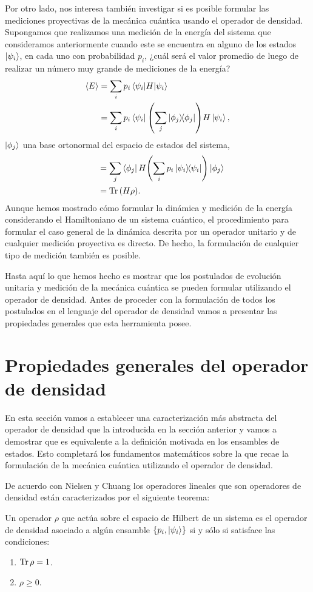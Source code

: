 Por otro lado, nos interesa también investigar si es posible formular
las mediciones proyectivas de la mecánica cuántica usando el operador de 
densidad. 
Supongamos que realizamos una medición de la energía del sistema que
consideramos anteriormente cuando este se encuentra en alguno de los 
estados $\ket{\psi_{i} }$, en cada uno con probabilidad $p_i$,
¿cuál será el valor promedio de luego de realizar un número
muy grande de mediciones de la energía?
\begin{align}
	\expval{E} &= \sum_i p_i\matrixel{\psii}{H}{\psii} \\
	&= \sum_i p_i\bra{\psii}\qty(\sum_j \dyad{\phi_j}{\phi_j})H\ket{\psii},
\end{align}
$\ket{\phi_j}$ una base ortonormal del espacio de estados del sistema,
\begin{align}
	\hspace{3mm}&= \sum_j \bra{\phi_j}H\qty(\sum_i p_i \dyad{\psii}{\psii})\ket{\phi_j} \\
	&= \Tr \qty(H\rho).
\end{align}
Aunque hemos mostrado cómo formular la dinámica y medición de la 
energía considerando el Hamiltoniano de un sistema cuántico, 
el procedimiento para formular el caso general de la dinámica
descrita por un operador unitario y de cualquier medición 
proyectiva es directo. De hecho, la formulación de cualquier tipo
de medición también es posible. 

Hasta aquí lo que hemos hecho es mostrar que los postulados de 
evolución unitaria y medición de la mecánica cuántica 
se pueden formular utilizando el operador de densidad.
Antes de proceder con la formulación de todos los postulados en el 
lenguaje del operador de densidad vamos a presentar las propiedades 
generales que esta herramienta posee. 

\section{Propiedades generales del operador de densidad} %
En esta sección vamos a establecer una caracterización 
más abstracta del operador de densidad que la introducida en 
la sección anterior y vamos a demostrar que es equivalente 
a la definición motivada en los ensambles de estados. 
Esto completará los fundamentos matemáticos
sobre la que recae la formulación de la mecánica cuántica 
utilizando el operador de densidad. 

De acuerdo con Nielsen y Chuang \cite{nielsen_chuang_2011}
los operadores lineales que son operadores de densidad están 
caracterizados por el siguiente teorema:
\begin{teorema}
Un operador $\rho$  que actúa sobre el espacio de Hilbert de un sistema 
es el operador de densidad asociado a algún ensamble 
$\{p_i, \ket{\psi _i} \}$ si y sólo si satisface las condiciones:
\begin{enumerate}
\item $\Tr \rho = 1$.
\item $\rho \geq 0$.
\end{enumerate}	
\label{teo:density-operator}
\end{teorema}

